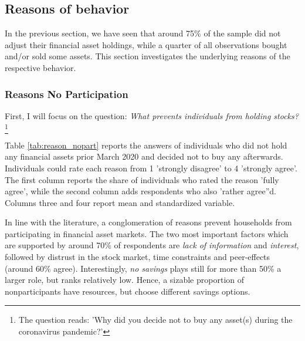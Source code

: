 \documentclass[ProjectABM]{subfiles}
\begin{document}




\subsection{Reasons of behavior}
In the previous section, we have seen that around 75\% of the sample did not adjust their financial asset holdings, while a quarter of all observations bought and/or sold some assets. This section investigates the underlying reasons of the respective behavior.

\subsubsection{Reasons No Participation}\label{sec:reason_nopart}
First, I will focus on the question: \textit{What prevents individuals from holding stocks?}\footnote{The question reads: 'Why did you decide not to buy any asset(s) during the coronavirus pandemic?'} 

Table \ref{tab:reason_nopart} reports the answers of individuals who did not hold any financial assets prior March 2020 and decided not to buy any afterwards. Individuals could rate each reason from 1 'strongly disagree' to 4 'strongly agree'. The first column reports the share of individuals who rated the reason 'fully agree', while the second column adds respondents who also 'rather agree''d. Columns three and four report mean and standardized variable. %

In line with the literature, a conglomeration of reasons prevent households from participating in financial asset markets. The two most important factors which are supported by around 70\% of respondents are \textit{lack of information} and \textit{interest}, followed by distrust in the stock market, time constraints and peer-effects (around 60\% agree). Interestingly, \textit{no savings} plays still for more than 50\% a larger role, but ranks relatively low. Hence, a sizable proportion of nonparticipants have resources, but choose different savings options. %
\end{document}
